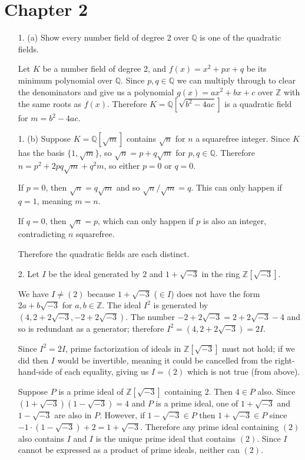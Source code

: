 \documentclass{article}
\begin{document}
\section*{Chapter 2}

\begin{enumerate}

\item[1. (a)] Show every number field of degree 2 over $\mathbb{Q}$ is one of the quadratic fields.

Let $K$ be a number field of degree 2, and $f(x) = x^2 + px + q$ be its minimum polynomial over $\mathbb{Q}$.  Since $p, q \in \mathbb{Q}$ we can multiply through to clear the denominators and give us a polynomial $g(x) = ax^2 + bx + c$ over $\mathbb{Z}$ with the same roots as $f(x)$.  Therefore $K = \mathbb{Q}[\sqrt{b^2 - 4ac}]$ is a quadratic field for $m = b^2 - 4ac$.

\item[1. (b)] Suppose $K = \mathbb{Q}[\sqrt{m}]$ contains $\sqrt{n}$ for $n$ a squarefree integer.  Since $K$ has the basis $\{1, \sqrt{m}\}$, so $\sqrt{n} = p + q\sqrt{m}$ for $p, q \in \mathbb{Q}$. Therefore $n = p^2 + 2pq\sqrt{m} + q^2m$, so either $p = 0$ or $q = 0$.

If $p = 0$, then $\sqrt{n} = q\sqrt{m}$ and so $\sqrt{n} / \sqrt{m} = q$.  This can only happen if $q = 1$, meaning $m = n$.

If $q = 0$, then $\sqrt{n} = p$, which can only happen if $p$ is also an integer, contradicting $n$ squarefree.

Therefore the quadratic fields are each distinct.

\item[2.]
    Let $I$ be the ideal generated by $2$ and $1 + \sqrt{-3}$ in the ring $\mathbb{Z}[\sqrt{-3}]$.

    We have $I \neq (2)$ because $1 + \sqrt{-3}$ ($\in I$) does not have the form $2a + b\sqrt{-3}$ for $a, b \in \mathbb{Z}$.  The ideal $I^2$ is generated by $(4, 2 + 2\sqrt{-3}, -2 + 2\sqrt{-3})$.  The number $-2 + 2\sqrt{-3} = 2 + 2\sqrt{-3} - 4$ and so is redundant as a generator; therefore $I^2 = (4, 2 + 2\sqrt{-3}) = 2I$.

    Since $I^2 = 2I$, prime factorization of ideals in $\mathbb{Z}[\sqrt{-3}]$ must not hold; if we did then $I$ would be invertible, meaning it could be cancelled from the right-hand-side of each equality, giving us $I = (2)$ which is not true (from above).

    Suppose $P$ is a prime ideal of $\mathbb{Z}[\sqrt{-3}]$ containing $2$.  Then $4 \in P$ also.  Since $(1 + \sqrt{-3})(1 - \sqrt{-3}) = 4$ and $P$ is a prime ideal, one of $1 + \sqrt{-3}$ and $1 - \sqrt{-3}$ are also in $P$.  However, if $1 - \sqrt{-3} \in P$ then $1 + \sqrt{-3} \in P$ since $-1 \cdot (1 - \sqrt{-3}) + 2 = 1 + \sqrt{-3}$.  Therefore any prime ideal containing $(2)$ also contains $I$ and $I$ is the unique prime ideal that contains $(2)$.  Since $I$ cannot be expressed as a product of prime ideals, neither can $(2)$.


\end{enumerate}
\end{document}
